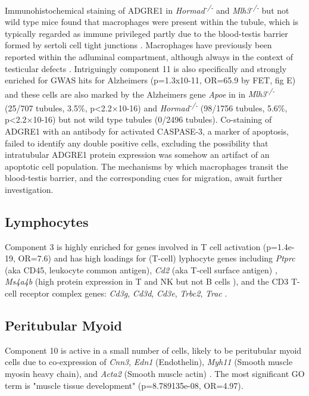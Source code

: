 Immunohistochemical staining of ADGRE1 in \textit{Hormad\textsuperscript{-/-}} and \textit{Mlh3\textsuperscript{-/-}} but not wild type mice found that macrophages were present within the tubule, which is typically regarded as immune privileged partly due to the blood-testis barrier formed by sertoli cell tight junctions \parencite{Fijak2006testis}. Macrophages have previously been reported within the adluminal compartment, although always in the context of testicular defects \parencite{Frungieri2002Number, Goluza2014Macrophages}. Intriguingly component 11 is also specifically and strongly enriched for GWAS hits for Alzheimers (p=1.3x10-11, OR=65.9 by FET, fig \label{fig:MiscComponents}E) and these cells are also marked by the Alzheimers gene \textit{Apoe} in in \textit{Mlh3\textsuperscript{-/-}} (25/707 tubules, 3.5\%, p<2.2×10-16) and \textit{Hormad\textsuperscript{-/-}} (98/1756 tubules, 5.6\%, p<2.2×10-16) but not wild type tubules (0/2496 tubules). Co-staining of ADGRE1 with an antibody for activated CASPASE-3, a marker of apoptosis, failed to identify any double positive cells, excluding the possibility that intratubular ADGRE1 protein expression was somehow an artifact of an apoptotic cell population. The mechanisms by which macrophages transit the blood-testis barrier, and the corresponding cues for migration, await further investigation.


\subsection{Lymphocytes}
Component 3 is highly enriched for genes involved in T cell activation (p=1.4e-19, OR=7.6) and has high loadings for (T-cell) lyphocyte genes including \textit{Ptprc} (aka CD45, leukocyte common antigen), \textit{Cd2} (aka T-cell surface antigen) \parencite{Murray2011Protective, Murphy2012Janeway}, \textit{Ms4a4b} (high protein expression in T and NK but not B cells \cite{Xu2010MS4a4B}), and the CD3 T-cell receptor complex genes: \textit{Cd3g}, \textit{Cd3d}, \textit{Cd3e}, \textit{Trbc2}, \textit{Trac} \parencite{Call2002Organizing}.


\subsection{Peritubular Myoid}

Component 10 is active in a small number of cells, likely to be peritubular myoid cells due to co-expression of \textit{Cnn3}, \textit{Edn1} (Endothelin), \textit{Myh11} (Smooth muscle myosin heavy chain), and \textit{Acta2} (Smooth muscle actin) \parencite{Mayerhofer2013Human}. The most significant GO term is "muscle tissue development" (p=8.789135e-08, OR=4.97).


